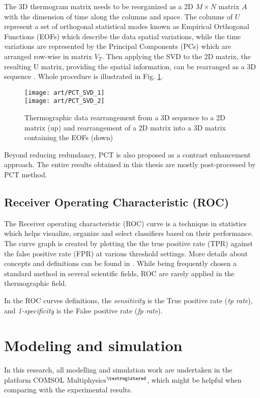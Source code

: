 The 3D thermogram matrix needs to be reorganized as a 2D $M\times N$ matrix $A$ with the dimension of time along the columns and space. The columns of $U$ represent a set of orthogonal statistical modes known as Empirical
Orthogonal Functions (EOFs) which describe the data spatial variations, while the time variations are represented by the Principal Components (PCs) which are arranged row-wise in matrix $V_T$. Then applying the SVD to the 2D matrix, the resulting U matrix, providing the spatial information, can be rearranged as a 3D sequence \citep{Ibarra-Castanedo2006}. Whole procedure is illustrated in Fig. \ref{PCT_SVD}.
\begin{figure}[!ht]
	\centering
	\texttt{[image: art/PCT\_SVD\_1]}\\
	\texttt{[image: art/PCT\_SVD\_2]}
	\caption{Thermographic data rearrangement from a 3D sequence to a 2D matrix (up) and rearrangement of a 2D matrix into a 3D matrix containing the EOFs (down)}
	\label{PCT_SVD}
\end{figure}

Beyond reducing redundancy, PCT is also proposed as a contrast enhancement approach.
The entire results obtained in this thesis are mostly post-processed by PCT method.

\subsection{Receiver Operating 	Characteristic (ROC)}
The Receiver operating characteristic (ROC) curve is a technique in statistics which helps visualize, organize and select classifiers based on their performance. The curve graph is created by plotting the the true positive rate (TPR) against the false positive rate (FPR) at various threshold settings. More details about concepts and definitions can be found in \citep{Fawcett2006}. While being frequently chosen a standard method in several scientific fields, ROC are rarely applied in the thermographic field.\citep{Bison2014a} 

In the ROC curves definitions, the \textit{sensitivity} is the True positive rate (\textit{tp rate}), and \textit{1-specificity} is the False positive rate (\textit{fp rate}).


\section{Modeling and simulation}
In this research, all modelling and simulation work are undertaken in the platform COMSOL Multiphysics$^{\textregistered}$, which might be helpful when comparing with the experimental results.

